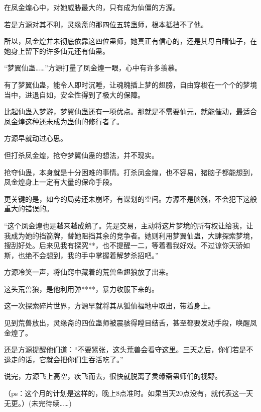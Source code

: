 \begin{this_body}
在凤金煌心中，对她威胁最大的，只有成为仙僵的方源。

若是方源对其不利，灵缘斋的那四位五转蛊师，根本抵挡不了他。

所以，凤金煌并未彻底依靠这四位蛊师，她真正有信心的，还是其母白晴仙子，在她身上留下的许多仙元还有仙蛊。

“梦翼仙蛊……”方源打量了凤金煌一眼，心中有许多羡慕。

有了梦翼仙蛊，能令人即时沉睡，让魂魄插上梦的翅膀，自由穿梭在一个个的梦境当中，进退自如，安全性得到了极大的保障。

比起仙蛊入梦游，梦翼仙蛊还有一项优点。那就是不需要仙元，就能催动，最适合凤金煌这种还未成为蛊仙的修行者了。

方源早就动过心思。

但打杀凤金煌，抢夺梦翼仙蛊的想法，并不现实。

抢夺仙蛊，本身就是十分困难的事情。打杀凤金煌，也不容易，猪脑子都能想到，凤金煌身上一定有大量的保命手段。

更关键的是，如今的局势还未崩坏，有谋划的空间。方源不是脑残，不会犯下这般重大的错误的。

“这个凤金煌也是越来越成熟了。先是交易，主动将这片梦境的所有权让给我，让我成为她的挡箭牌，替她阻挡其余的竞争者。她则利用梦翼仙蛊，大肆探索梦境，搜刮好处。后来见我有探究**，也不提醒一二，等着看我好戏。不过谅你天骄如斯，也绝不会想到，我的手中掌握着解梦杀招吧。”

方源冷笑一声，将仙窍中藏着的荒兽鱼翅狼放了出来。

这头荒兽狼，是他利用弹****，暴力收服下来的。

这一次探索碎片世界，方源早就将其从狐仙福地中取出，带着身上。

见到荒兽放出，灵缘斋的四位蛊师被震骇得瞠目结舌，甚至都要发动手段，唤醒凤金煌了。

还是方源提醒他们道：“不要紧张，这头荒兽会看守这里。三天之后，你们若是不退走的话，它就会把你们生吞活吃了。”

说完，方源飞上高空，疾飞而去，很快就脱离了灵缘斋蛊师们的视野。

（ps：这个月的计划是这样的，晚上8点准时。如果当天20点没有，就代表这一天无更。）(未完待续……)

\end{this_body}

